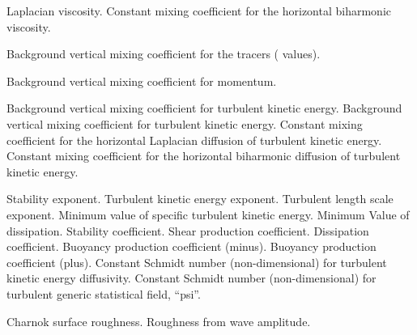 \begin{klist}
\begin{klist}
     Laplacian viscosity.
           Constant mixing coefficient for the horizontal
     biharmonic viscosity.
     \end{klist}
    \mbox{}
     \begin{klist}
         Background vertical mixing coefficient
     for the tracers ( values).
     \end{klist}
    \mbox{}
     \begin{klist}
         Background vertical mixing coefficient 
     for momentum.
     \end{klist}
    \mbox{}
     \begin{klist}
         Background vertical mixing coefficient
     for turbulent kinetic energy.
         Background vertical mixing coefficient
     for turbulent kinetic energy.
           Constant mixing coefficient for the horizontal
     Laplacian diffusion of turbulent kinetic energy.
           Constant mixing coefficient for the horizontal
     biharmonic diffusion of turbulent kinetic energy.
     \end{klist}
   \mbox{}
     \begin{klist}
          Stability exponent.
          Turbulent kinetic energy exponent.
          Turbulent length scale exponent.
         Minimum value of specific turbulent kinetic
       energy.
         Minimum Value of dissipation.
          Stability coefficient.
          Shear production coefficient.
          Dissipation coefficient.
          Buoyancy production coefficient (minus).
          Buoyancy production coefficient (plus).
        Constant Schmidt number (non-dimensional) for
       turbulent kinetic energy diffusivity.
         Constant Schmidt number (non-dimensional) for
       turbulent generic statistical field, ``psi''.
     \end{klist}
    \mbox{}
     \begin{klist}
        Charnok surface roughness.
        Roughness from wave amplitude.

\end{klist}
\end{klist}
